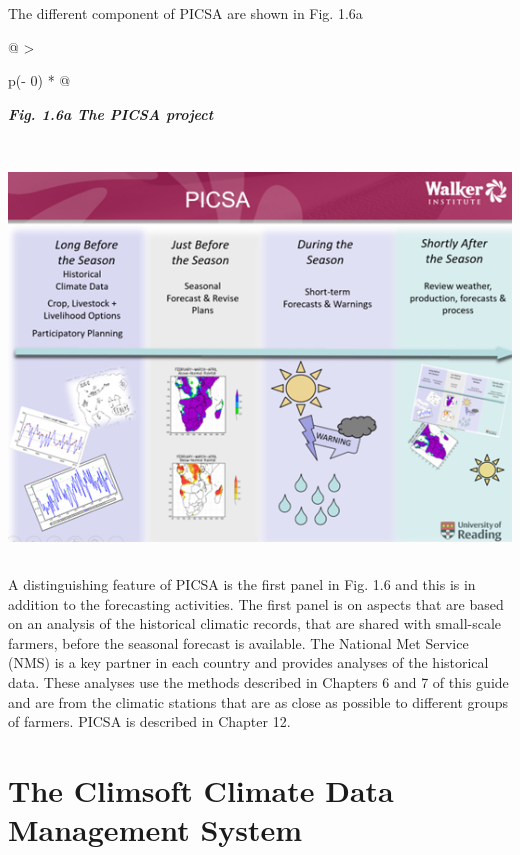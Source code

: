 \documentclass[
  letterpaper,
  DIV=11,
  numbers=noendperiod]{scrreprt}
\begin{document}
The different component of PICSA are shown in Fig. 1.6a

\begin{longtable}[]{@{}
  >{\raggedright\arraybackslash}p{(\columnwidth - 0\tabcolsep) * }@{}}
\toprule\noalign{}
\begin{minipage}[b]{\linewidth}\raggedright
\textbf{\emph{Fig. 1.6a The PICSA project}}
\end{minipage} \\
\midrule\noalign{}
\endhead
\bottomrule\noalign{}
\endlastfoot
\includegraphics[width=5.64347in,height=4.15038in]{figures/Fig1.6a.png} \\
\end{longtable}

A distinguishing feature of PICSA is the first panel in Fig. 1.6 and
this is in addition to the forecasting activities. The first panel is on
aspects that are based on an analysis of the historical climatic
records, that are shared with small-scale farmers, before the seasonal
forecast is available. The National Met Service (NMS) is a key partner
in each country and provides analyses of the historical data. These
analyses use the methods described in Chapters 6 and 7 of this guide and
are from the climatic stations that are as close as possible to
different groups of farmers. PICSA is described in Chapter 12.

\section{The Climsoft Climate Data Management
System}\label{the-climsoft-climate-data-management-system}
\end{document}
